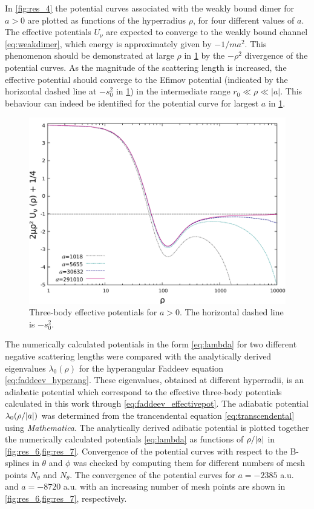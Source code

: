 In \cref{fig:res_4} the potential curves associated with the weakly bound dimer for $a>0$ are plotted as functions of the hyperradius $\rho$, for four different values of $a$. The effective potentials $U_{\nu}$ are expected to converge to the weakly bound channel \eqref{eq:weakdimer}, which energy is approximately given by $-1/ma^2$. This phenomenon should be demonstrated at
large $\rho$ in \cref{fig:res_5} by the $-\rho^2$ divergence of the potential curves. As the magnitude of the scattering length is increased, the effective potential should converge to the Efimov potential (indicated by the horizontal dashed line at $-s_0^2$ in  \cref{fig:res_5}) in the intermediate range $r_0 \ll \rho \ll |a|$. This behaviour can indeed be identified for the potential curve for largest $a$ in \cref{fig:res_5}.

\begin{figure}
	\includegraphics[width=\linewidth]{plotpos.pdf}
	\caption{Three-body effective potentials for $a>0$. The horizontal dashed line is $-s_0^2$.}
	\label{fig:res_5}
\end{figure}

The numerically calculated potentials in the form \eqref{eq:lambda} for two different negative scattering lengths were compared with the analytically derived eigenvalues $\lambda_0(\rho)$ for the hyperangular Faddeev equation \eqref{eq:faddeev_hyperang}. These eigenvalues, obtained at different hyperradii, is an adiabatic potential which correspond to the effective three-body potentials calculated in this work through \eqref{eq:faddeev_effectivepot}. The adiabatic potential $\lambda_0(\rho/\lvert a\rvert)$ was determined from the trancendental equation \eqref{eq:transcendental} using \textit{Mathematica}. The analytically derived adibatic potential is plotted together the numerically calculated potentials \eqref{eq:lambda} as functions of $\rho/\lvert a\rvert$ in \cref{fig:res_6,fig:res_7}. Convergence of the potential curves with respect to the B-splines in $\theta$ and $\phi$ was checked by computing them for different numbers of mesh points $N_{\theta}$ and $N_{\theta}$. The convergence of the potential curves for $a=-2385$ a.u. and $a=-8720$ a.u. with an increasing number of mesh points are shown in \cref{fig:res_6,fig:res_7}, respectively. 

